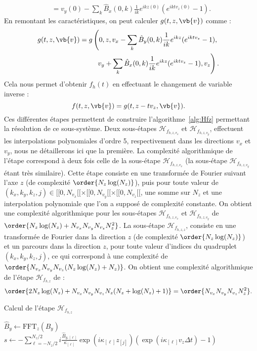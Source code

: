 \begin{itemize}
$$\begin{aligned}
               &= v_y(0) - \sum_k \hat{B}_{x} (0, k)\frac{1}{ik}e^{ik z(0)} (e^{ikt v_z(0)} -1).
      \end{aligned}
    $$
    En remontant les caractéristiques, on peut calculer $g(t,z,\vb{v})$ comme :
    $$
      \begin{aligned}
        g(t, z, \vb{v}) = g\left(0, z, v_x - \sum_k \hat{B}_{y}(0, k) \frac{1}{ik} e^{ik z}(e^{ikt v_z} -1), \right.\\
                                \left.v_y +   \sum_k \hat{B}_{x} (0, k)\frac{1}{ik} e^{ik z}(e^{ikt v_z} -1), v_z\right).  
      \end{aligned}
    $$
    Cela nous permet d'obtenir $f_h(t)$ en effectuant le changement de variable inverse :
    $$
      f(t,z,\vb{v}) = g(t,z-tv_z,\vb{v}).
    $$
    Ces différentes étapes permettent de construire l'algorithme~\ref{alg:Hfz} permettant la résolution de ce sous-système. Deux sous-étapes $\mathcal{H}_{f_{h,z,v_x}}$ et $\mathcal{H}_{f_{h,z,v_y}}$, effectuent les interpolations polynomiales d'ordre 5, respectivement dans les directions $v_x$ et $v_y$, nous ne détaillerons ici que la première. La complexité algorithmique de l'étape correspond à deux fois celle de la sous-étape $\mathcal{H}_{f_{h,z,v_x}}$ (la sous-étape $\mathcal{H}_{f_{h,z,v_y}}$ étant très similaire). Cette étape consiste en une transformée de Fourier suivant l'axe $z$ (de complexité $\order{N_z\log(N_z)}$), puis pour toute valeur de $(k_x,k_y,k_z,j)\in[\![0,N_{v_x}[\![\times[\![0,N_{v_y}[\![\times[\![0,N_{v_z}[\![$, une somme sur $N_z$ et une interpolation polynomiale que l'on a supposé de complexité constante. On obtient une complexité algorithmique pour les sous-étapes $\mathcal{H}_{f_{h,z,v_x}}$ et $\mathcal{H}_{f_{h,z,v_y}}$ de $\order{N_z\log(N_z)+N_{v_x}N_{v_y}N_{v_z}N_z^2}$. La sous-étape $\mathcal{H}_{f_{h,z,z}}$, consiste en une transformée de Fourier dans la direction $z$ (de complexité $\order{N_z\log(N_z)}$) et un parcours dans la direction $z$, pour toute valeur d'indices du quadruplet $(k_x,k_y,k_z,j)$, ce qui correspond à une complexité de $\order{N_{v_x}N_{v_y}N_{v_z}(N_z\log(N_z)+N_z)}$. On obtient une complexité algorithmique de l'étape $\mathcal{H}_{f_{h,z}}$ de :
    $$
      \order{2N_z\log(N_z) + N_{v_x}N_{v_y}N_{v_z}N_z(N_z + \log(N_z) + 1)}=\order{N_{v_x}N_{v_y}N_{v_z}N_z^2}.
    $$
    \begin{algorithm}
      \caption{Calcul de l'étape $\mathcal{H}_{f_{h,z}}$}
      \label{alg:Hfz}
      \begin{algorithmic}[1]
          \State $\hat{B}_y \gets \text{FFT}_z(B_y)$
          \ForAll{$(k_x,k_y,k_z)\in[\![0,N_{v_x}[\![\times[\![0,N_{v_y}[\![\times[\![0,N_{v_z}[\![$}
              \State $s \gets -\sum_{\ell=-N_z/2}^{N_z/2} i\frac{\hat{B}_{y,[\ell]}}{\kappa_{[\ell]}}\exp(i\kappa_{[\ell]}z_{[j]})(\exp(i\kappa_{[\ell]}v_z\Delta t) - 1)$


\end{algorithmic}
\end{algorithm}
\end{itemize}
